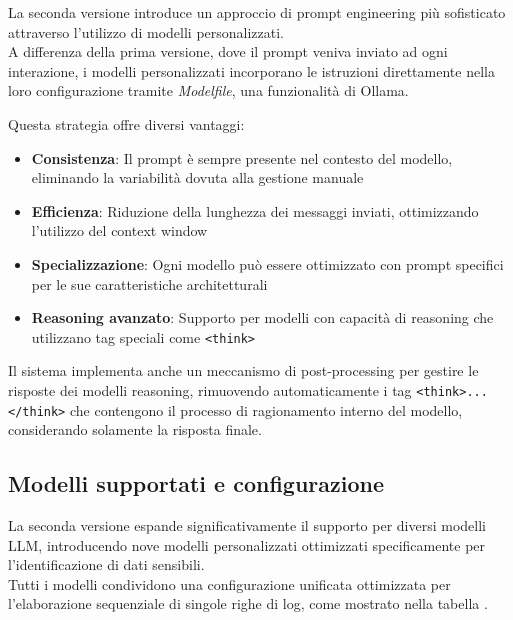 \documentclass[12pt]{report}
\begin{document}
La seconda versione introduce un approccio di prompt engineering più sofisticato attraverso l'utilizzo di modelli personalizzati. \\
A differenza della prima versione, dove il prompt veniva inviato ad ogni interazione, i modelli personalizzati incorporano le istruzioni direttamente nella loro configurazione tramite \textit{Modelfile}, una funzionalità di Ollama.

Questa strategia offre diversi vantaggi:
\begin{itemize}
    \item \textbf{Consistenza}: Il prompt è sempre presente nel contesto del modello, eliminando la variabilità dovuta alla gestione manuale
    \item \textbf{Efficienza}: Riduzione della lunghezza dei messaggi inviati, ottimizzando l'utilizzo del context window
    \item \textbf{Specializzazione}: Ogni modello può essere ottimizzato con prompt specifici per le sue caratteristiche architetturali
    \item \textbf{Reasoning avanzato}: Supporto per modelli con capacità di reasoning che utilizzano tag speciali come \texttt{<think>}
\end{itemize}

Il sistema implementa anche un meccanismo di post-processing per gestire le risposte dei modelli reasoning, rimuovendo automaticamente i tag \texttt{<think>...</think>} che contengono il processo di ragionamento interno del modello, considerando solamente la risposta finale.

\subsection{Modelli supportati e configurazione}
\label{subsec:ver2_modelli_supportati}

La seconda versione espande significativamente il supporto per diversi modelli LLM, introducendo nove modelli personalizzati ottimizzati specificamente per l'identificazione di dati sensibili. \\
Tutti i modelli condividono una configurazione unificata ottimizzata per l'elaborazione sequenziale di singole righe di log, come mostrato nella tabella .
\end{document}
